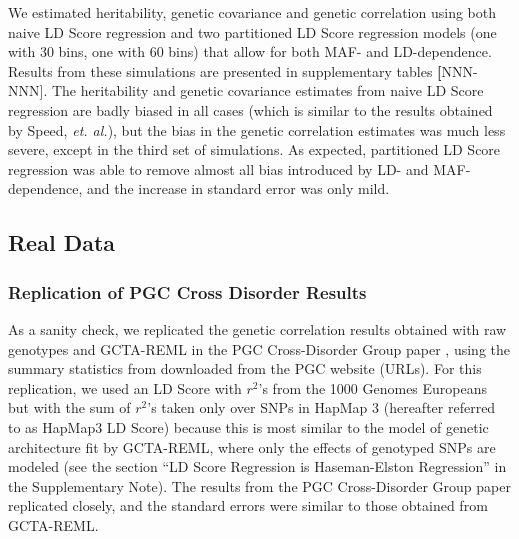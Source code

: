 \documentclass[11pt]{article}
\numberwithin{equation}{section}
\begin{document}
We  estimated heritability, genetic covariance and genetic correlation using both naive LD Score regression 
and two partitioned LD Score regression models (one with 30 bins, one with 60 bins) 
that allow for both MAF- and LD-dependence.
Results from these simulations are presented in supplementary tables \textbf[NNN-NNN].
The heritability and genetic covariance estimates from naive LD Score regression are badly biased in all cases
(which is similar to the results obtained by Speed, \emph{et. al.}), 
but the bias in the genetic correlation estimates was much less severe, except in the third set of simulations.
As expected, partitioned LD Score regression was able to remove almost all bias introduced by LD- and MAF-dependence,
and the increase in standard error was only mild.



\subsection{Real Data}\label{Real Data}

\subsubsection{Replication of PGC Cross Disorder Results}

As a sanity check, we replicated the genetic correlation results obtained with
raw genotypes and GCTA-REML in
the PGC Cross-Disorder Group paper \cite{pgccdg2013}, 
using the summary statistics from \cite{cross2013identification} downloaded from the PGC website (URLs).
For this replication, we used an LD Score with $r^2$'s from the 1000 Genomes Europeans \cite{10002012integrated}
but with the sum of $r^2$'s taken only over SNPs in HapMap 3 \cite{international2010integrating} 
(hereafter referred to as HapMap3 LD Score)
because this is most similar to the model of genetic architecture fit by GCTA-REML,
where only the effects of genotyped SNPs are modeled
(see the section ``LD Score Regression is Haseman-Elston Regression'' in the Supplementary Note). 
The results from the PGC Cross-Disorder Group paper replicated closely, 
and the standard errors were similar to those obtained from GCTA-REML.

\end{document}
